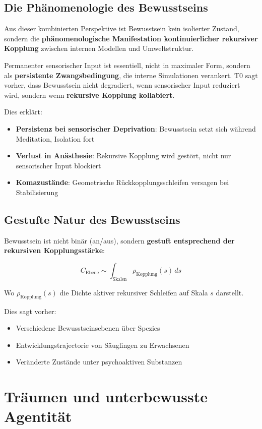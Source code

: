 	\subsection{Die Phänomenologie des Bewusstseins}
	
	Aus dieser kombinierten Perspektive ist Bewusstsein kein isolierter Zustand, sondern die \textbf{phänomenologische Manifestation kontinuierlicher rekursiver Kopplung} zwischen internen Modellen und Umweltstruktur.
	
	Permanenter sensorischer Input ist essentiell, nicht in maximaler Form, sondern als \textbf{persistente Zwangsbedingung}, die interne Simulationen verankert. T0 sagt vorher, dass Bewusstsein nicht degradiert, wenn sensorischer Input reduziert wird, sondern wenn \textbf{rekursive Kopplung kollabiert}.
	
	Dies erklärt:
	\begin{itemize}
		\item \textbf{Persistenz bei sensorischer Deprivation}: Bewusstsein setzt sich während Meditation, Isolation fort
		\item \textbf{Verlust in Anästhesie}: Rekursive Kopplung wird gestört, nicht nur sensorischer Input blockiert
		\item \textbf{Komazustände}: Geometrische Rückkopplungsschleifen versagen bei Stabilisierung
	\end{itemize}
	
	\subsection{Gestufte Natur des Bewusstseins}
	
	Bewusstsein ist nicht binär (an/aus), sondern \textbf{gestuft entsprechend der rekursiven Kopplungsstärke}:
	
	\[
	C_{\text{Ebene}} \sim \int_{\text{Skalen}} \rho_{\text{Kopplung}}(s) \, ds
	\]
	
	Wo $\rho_{\text{Kopplung}}(s)$ die Dichte aktiver rekursiver Schleifen auf Skala $s$ darstellt.
	
	Dies sagt vorher:
	\begin{itemize}
		\item Verschiedene Bewusstseinsebenen über Spezies
		\item Entwicklungstrajectorie von Säuglingen zu Erwachsenen
		\item Veränderte Zustände unter psychoaktiven Substanzen
	\end{itemize}
	
	\section{Träumen und unterbewusste Agentität}
	
